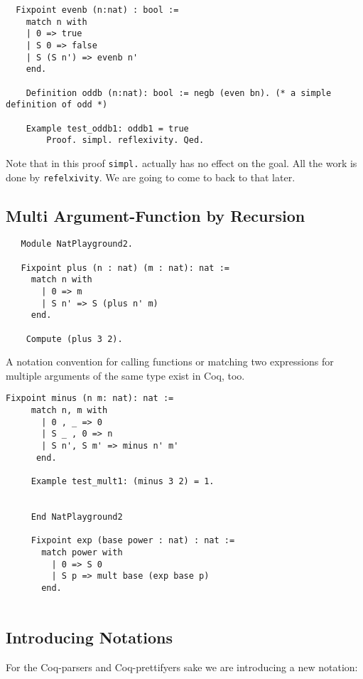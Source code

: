   \begin{lstlisting}
  Fixpoint evenb (n:nat) : bool :=
  	match n with
  	| 0 => true
  	| S 0 => false
  	| S (S n') => evenb n'
  	end.
  	
  	Definition oddb (n:nat): bool := negb (even bn). (* a simple definition of odd *)
  	
  	Example test_oddb1: oddb1 = true
    	Proof. simpl. reflexivity. Qed.
  \end{lstlisting}
   Note that in this proof \lstinline!simpl.! actually has no effect on the goal. 
   All the work is done by \lstinline!refelxivity!. 
   We are going to come to back to that later.
   
   \subsection{Multi Argument-Function by Recursion}
   
   \begin{lstlisting}
   Module NatPlayground2.
   
   Fixpoint plus (n : nat) (m : nat): nat :=
     match n with
       | 0 => m
       | S n' => S (plus n' m)
     end.
     
    Compute (plus 3 2). 
   \end{lstlisting}   
    A notation convention for calling functions or matching two expressions for multiple arguments of the same type exist in Coq, too.
   
   \begin{lstlisting}[label = lst:minus_nat, caption={ \lstinline!minus! and \lstinline!exp!}]
    Fixpoint minus (n m: nat): nat :=
     match n, m with
       | 0 , _ => 0
       | S _ , 0 => n
       | S n', S m' => minus n' m'
      end.
      
     Example test_mult1: (minus 3 2) = 1.
     
      
     End NatPlayground2
     
     Fixpoint exp (base power : nat) : nat :=
       match power with
         | 0 => S 0
         | S p => mult base (exp base p)
       end.
         
   \end{lstlisting}
        
   \subsection{Introducing Notations}


    For the Coq-parsers and Coq-prettifyers sake we are introducing a new notation:
    
